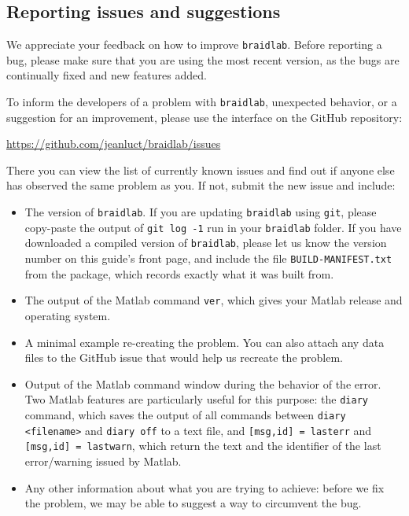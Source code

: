 \documentclass[12pt]{article}
\newcommand{\braidlab}{\texttt{braidlab}}%
\begin{document}
\subsection{Reporting issues and suggestions}
\label{sec:reporting-issues}

We appreciate your feedback on how to improve \braidlab. Before reporting a
bug, please make sure that you are using the most recent version, as the bugs
are continually fixed and new features added.

To inform the developers of a problem with \braidlab, unexpected behavior, or
a suggestion for an improvement, please use the interface on the GitHub
repository:
\begin{center}\url{https://github.com/jeanluct/braidlab/issues} \end{center}

There you can view the list of currently known issues and find out if anyone
else has observed the same problem as you. If not, submit the new issue and
include:
\begin{itemize}
\item The version of \braidlab. If you are updating \braidlab{} using
  \lstinline{git}, please copy-paste the output of \lstinline{git log -1} run
  in your \braidlab{} folder. If you have downloaded a compiled version of
  \braidlab{}, please let us know the version number on this guide's front
  page, and include the file \lstinline{BUILD-MANIFEST.txt} from the package,
  which records exactly what it was built from.
\item The output of the Matlab command \lstinline{ver}, which gives your
  Matlab release and operating system.
\item A minimal example re-creating the problem. You can also attach any data
  files to the GitHub issue that would help us recreate the problem.
\item Output of the Matlab command window during the behavior of the
  error. Two Matlab features are particularly useful for this purpose: the
  \lstinline{diary} command, which saves the output of all commands between
  \lstinline{diary <filename>} and \lstinline{diary off} to a text file, and
  \lstinline{[msg,id] = lasterr} and \lstinline{[msg,id] = lastwarn}, which
  return the text and the identifier of the last error/warning issued by
  Matlab.
\item Any other information about what you are trying to achieve: before we
  fix the problem, we may be able to suggest a way to circumvent the bug.
\end{itemize}
\end{document}

